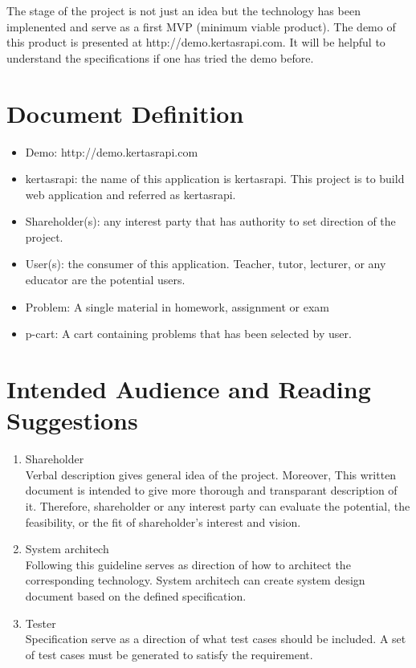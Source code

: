 \documentclass{scrreprt}
\begin{document}
The stage of the project is not just an idea but the technology has been implenented and serve as a first MVP (minimum viable product). The demo of this product is presented at http://demo.kertasrapi.com. It will be helpful to understand the specifications if one has tried the demo before. 

\section{Document Definition}
\begin{itemize}
\item Demo: http://demo.kertasrapi.com
\item kertasrapi: the name of this application is kertasrapi. This project is to build web application and referred as kertasrapi. 
\item Shareholder(s): any interest party that has authority to set direction  of the project.
\item User(s): the consumer of this application. Teacher, tutor, lecturer, or any educator are the potential users.
\item Problem: A single material in  homework, assignment or exam
\item p-cart: A cart containing problems that has been selected by user.
\end{itemize}

\section{Intended Audience and Reading Suggestions}
\begin{enumerate}
\item Shareholder  \\
  Verbal description gives general idea of the project. Moreover, This written document is intended to give more thorough and transparant description of it. Therefore, shareholder or any interest party can evaluate the potential, the feasibility, or the fit of shareholder's interest and vision.  
\item System architech \\
 Following this guideline serves as direction of how to architect the corresponding technology. System architech can create system design document based on the defined specification.
\item Tester  \\
    Specification serve as a direction of what test cases should be included. A set of test cases must be generated to satisfy the requirement. 
\end{enumerate}
\end{document}
